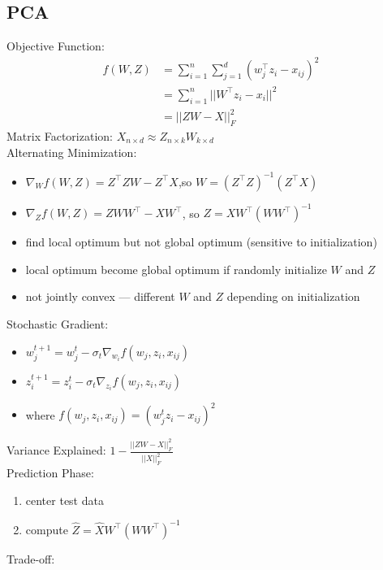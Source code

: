 \documentclass[10pt,landscape,a4paper]{article}
\begin{document}
\begin{multicols*}{5}
\section{PCA}
Objective Function:
\begin{align*}
    f(W,Z) &= \sum_{i=1}^{n} \sum_{j=1}^{d} (w_j^\intercal z_i - x_{ij})^2 \\
    &= \sum_{i=1}^{n} ||W^\intercal z_i - x_i||^2 \\
    &= ||ZW-X||_F^2
\end{align*}
Matrix Factorization: \(X_{n \times d} \approx Z_{n \times k} W_{k \times d}\) \\
Alternating Minimization:
\begin{itemize}
    \item \(\nabla_W f(W,Z) = Z^\intercal Z W - Z^\intercal X\),so \(W = (Z^\intercal Z)^{-1} (Z^\intercal X)\)
    \item \(\nabla_Z f(W,Z) = Z W W^\intercal - X W^\intercal \), so \(Z = X W^\intercal (W W^\intercal)^{-1}\)
    \item find local optimum but not global optimum (sensitive to initialization)
    \item local optimum become global optimum if randomly initialize \(W\) and \(Z\)
    \item not jointly convex --- different \(W\) and \(Z\) depending on initialization
\end{itemize}
Stochastic Gradient:
\begin{itemize}
    \item \(w_j^{t+1} = w_j^t - \sigma_t \nabla_{w_i} f(w_j,z_i,x_{ij})\)
    \item \(z_i^{t+1} = z_i^t - \sigma_t \nabla_{z_i} f(w_j,z_i,x_{ij})\)
    \item where \(f(w_j,z_i,x_{ij}) = (w_j^t z_i - x_{ij})^2\)
\end{itemize}
Variance Explained: \(1 - \frac{||ZW-X||_F^2}{||X||_F^2}\) \\
Prediction Phase:
\begin{enumerate}
    \item center test data
    \item compute \(\hat{Z} = \hat{X} W^\intercal (W W^\intercal)^{-1}\)
\end{enumerate}
Trade-off:

\end{multicols*}
\end{document}
